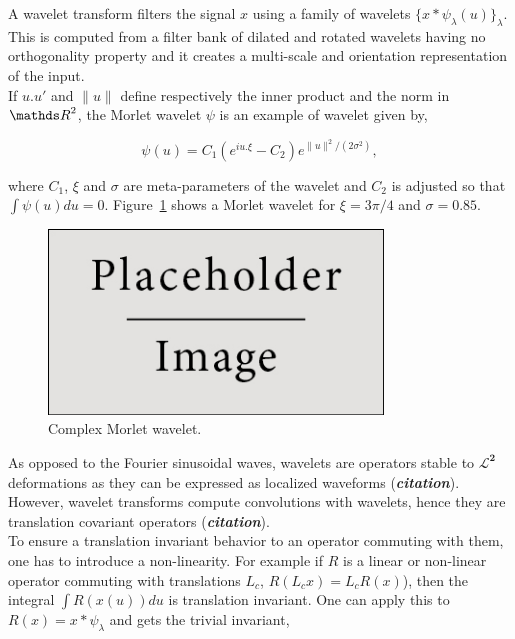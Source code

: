 \documentclass[a4paper,11pt]{report}
\begin{document}
{      A wavelet transform filters the signal $x$ using a family of wavelets $\{x \ast \psi_{\lambda}(u)\}_{\lambda}$. This is computed from a filter bank of dilated and rotated wavelets having no orthogonality property and it creates a multi-scale and orientation representation of the input.\\ 
      
      If $u.u'$ and $\|u\|$ define respectively the inner product and the norm in $\dsR^{2}$, the Morlet wavelet $\psi$ is an example of wavelet given by,
      
      \begin{equation*} 
				\label{eq:Morlet wavelet}
				\psi(u) = C_{1}(e^{iu.\xi} - C_{2}) e^{\|u\|^{2}/(2 \sigma^{2})},
      \end{equation*}

      where $C_{1}$, $\xi$ and $\sigma$ are meta-parameters of the wavelet and $C_{2}$ is adjusted so that $\int \psi(u) du = 0$. Figure~\ref{fig:Morlet wavelet} shows a Morlet wavelet for  $\xi= 3\pi/4$ and $\sigma=0.85$.\\
      
      \begin{figure}
				\begin{center}
					\includegraphics[width=3.5in]{placeholder.jpg}
					\caption{Complex Morlet wavelet.}
					\label{fig:Morlet wavelet}
				\end{center}	
      \end{figure}
      
      As opposed to the Fourier sinusoidal waves, wavelets are operators stable to $\mathbf{\mathcal{L}^{2}}$ deformations as they can be expressed as localized waveforms (\textbf{\textit{citation}}). However, wavelet transforms compute convolutions with wavelets, hence they are translation covariant operators (\textbf{\textit{citation}}).\\
        
      To ensure a translation invariant behavior to an operator commuting with them, one has to introduce a non-linearity. For example if $R$ is a linear or non-linear operator commuting with translations $L_{c}$, \ie $R(L_{c}x) = L_{c}R(x)$), then the integral $\int R(x(u))du$ is  translation invariant. One can apply this to $R(x) = x \ast \psi_{\lambda}$ and gets the trivial invariant, 
      
}
\end{document}
